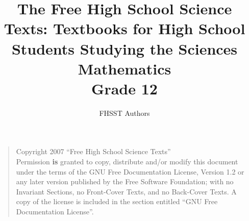 \documentclass[10pt,a4paper,titlepage,twoside,openright]{report}
\begin{document}
\title{The Free High School Science Texts: Textbooks for High School Students Studying the Sciences\\
\textbf{Mathematics}\\
Grade 12}
\author{FHSST Authors}
\maketitle
\cleardoublepage
\begin{quote}
Copyright 2007 ``Free High School Science Texts''\\
Permission \textbf{is} granted to copy, distribute and/or modify this document under the terms of the GNU Free Documentation License, Version 1.2 or any later version published by the Free Software Foundation; with no Invariant Sections, no Front-Cover Texts, and no Back-Cover Texts.
A copy of the license is included in the section entitled ``GNU Free Documentation License''.
\end{quote}
\end{document}
